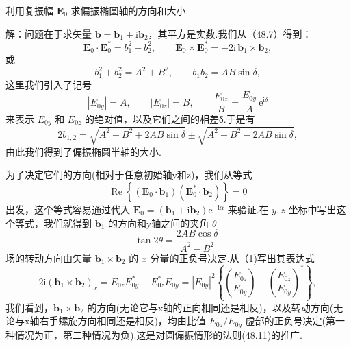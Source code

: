 \begin{xiti}

\quad 利用复振幅 $\boldsymbol{E}_0$ 求偏振椭圆轴的方向和大小.

解：问题在于求矢量 $\boldsymbol{b}=\boldsymbol{b}_1+\mathrm{i}\boldsymbol{b}_2$，其平方是实数.我们从（48.7）得到：
\begin{equation}\tag{1}
  \boldsymbol{E}_0\cdot\boldsymbol{E}_0^*=b_1^2+b_2^2,\qquad
  \boldsymbol{E}_0\times\boldsymbol{E}_0^*=-2\mathrm{i}\,\boldsymbol{b}_1\times\boldsymbol{b}_2,
\end{equation}
或
\begin{equation*}
  b_1^2+b_2^2=A^2+B^2,\qquad
  b_1b_2=AB\sin\delta,
\end{equation*}
这里我们引入了记号
\begin{equation*}
  |E_{0y}|=A,\qquad |E_{0z}|=B,\qquad
  \frac{E_{0z}}{B}=\frac{E_{0y}}{A}\,\mathrm{e}^{\mathrm{i}\delta}
\end{equation*}
来表示 $E_{0y}$ 和 $E_{0z}$ 的绝对值，以及它们之间的相差δ.于是有
\begin{equation}\tag{2}
  2b_{1,2}=\sqrt{A^2+B^2+2AB\sin\delta}
  \pm\sqrt{A^2+B^2-2AB\sin\delta},
\end{equation}
由此我们得到了偏振椭圆半轴的大小.

为了决定它们的方向(相对于任意初始轴y和z)，我们从等式
\begin{equation*}
  \operatorname{Re}\left\{(\boldsymbol{E}_0\cdot\boldsymbol{b}_1)
  (\boldsymbol{E}_0^*\cdot\boldsymbol{b}_2)\right\}=0
\end{equation*}
出发，这个等式容易通过代入
$\boldsymbol{E}_0=(\boldsymbol{b}_1+\mathrm{i}\boldsymbol{b}_2)\mathrm{e}^{-\mathrm{i}\alpha}$ 来验证.在 $y,z$ 坐标中写出这个等式，我们就得到 $\boldsymbol{b}_1$ 的方向和y轴之间的夹角 $\theta$
\begin{equation}\tag{3}
  \tan 2\theta=\frac{2AB\cos\delta}{A^2-B^2}.
\end{equation}
场的转动方向由矢量 $\boldsymbol{b}_1\times\boldsymbol{b}_2$ 的 $x$ 分量的正负号决定.从（1)写出其表达式
\begin{equation*}
  2\mathrm{i}(\boldsymbol{b}_1\times\boldsymbol{b}_2)_x
  =E_{0z}E_{0y}^*-E_{0z}^*E_{0y}
  =|E_{0y}|^2\left\{\left(\frac{E_{0z}}{E_{0y}}\right)
  -\left(\frac{E_{0z}}{E_{0y}}\right)^*\right\},
\end{equation*}
我们看到，$\boldsymbol{b}_1\times\boldsymbol{b}_2$ 的方向(无论它与x轴的正向相同还是相反)，以及转动方向(无论与x轴右手螺旋方向相同还是相反)，均由比值 $E_{0z}/E_{0y}$ 虚部的正负号决定(第一种情况为正，第二种情况为负).这是对圆偏振情形的法则(48.11)的推广.


\end{xiti}
